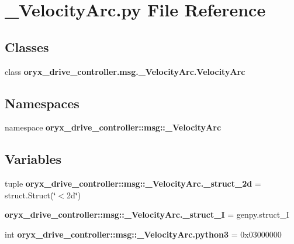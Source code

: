 \section{\-\_\-\-Velocity\-Arc.\-py \-File \-Reference}
\label{__VelocityArc_8py}
\subsection*{\-Classes}
\begin{DoxyCompactItemize}
\item 
class {\bf oryx\-\_\-drive\-\_\-controller.\-msg.\-\_\-\-Velocity\-Arc.\-Velocity\-Arc}
\end{DoxyCompactItemize}
\subsection*{\-Namespaces}
\begin{DoxyCompactItemize}
\item 
namespace {\bf oryx\-\_\-drive\-\_\-controller\-::msg\-::\-\_\-\-Velocity\-Arc}
\end{DoxyCompactItemize}
\subsection*{\-Variables}
\begin{DoxyCompactItemize}
\item 
tuple {\bf oryx\-\_\-drive\-\_\-controller\-::msg\-::\-\_\-\-Velocity\-Arc.\-\_\-struct\-\_\-2d} = struct.\-Struct(\char`\"{}$<$2d\char`\"{})
\item 
{\bf oryx\-\_\-drive\-\_\-controller\-::msg\-::\-\_\-\-Velocity\-Arc.\-\_\-struct\-\_\-\-I} = genpy.\-struct\-\_\-\-I
\item 
int {\bf oryx\-\_\-drive\-\_\-controller\-::msg\-::\-\_\-\-Velocity\-Arc.\-python3} = 0x03000000
\end{DoxyCompactItemize}
